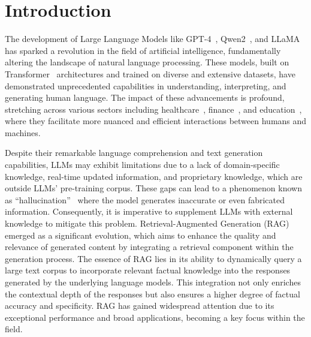 \documentclass[acmsmall]{acmart}
\begin{document}

\maketitle

\section{Introduction}\label{sec:intro}
The development of Large Language Models like GPT-4~\cite{ref:gpt4}, Qwen2~\cite{ref:qwen2}, and LLaMA~\cite{ref:llama3} has sparked a revolution in the field of artificial intelligence, fundamentally altering the landscape of natural language processing. These models, built on Transformer~\cite{ref:transformer} architectures and trained on diverse and extensive datasets, have demonstrated unprecedented capabilities in understanding, interpreting, and generating human language. The impact of these advancements is profound, stretching across various sectors including healthcare~\cite{ref:med1,ref:med2,ref:med3}, finance~\cite{ref:financialgpt,ref:finalcialgpt2}, and education~\cite{ref:edu1,ref:edu2}, where they facilitate more nuanced and efficient interactions between humans and machines.

Despite their remarkable language comprehension and text generation capabilities, LLMs may exhibit limitations due to a lack of domain-specific knowledge, real-time updated information, and proprietary knowledge, which are outside LLMs' pre-training corpus. These gaps can lead to a phenomenon known as ``hallucination''~\cite{ref:hallucination} where the model generates inaccurate or even fabricated information. Consequently, it is imperative to supplement LLMs with external knowledge to mitigate this problem. Retrieval-Augmented Generation (RAG)~\cite{ref:ragsurvey1,ref:ragsurvey2,ref:ragsurvey3,ref:ragsurvey4,ref:ragsurvey5,ref:ragsurvey6,ref:ragsurvey7} emerged as a significant evolution, which aims to enhance the quality and relevance of generated content by integrating a retrieval component within the generation process. The essence of RAG lies in its ability to dynamically query a large text corpus to incorporate relevant factual knowledge into the responses generated by the underlying language models. This integration not only enriches the contextual depth of the responses but also ensures a higher degree of factual accuracy and specificity. RAG has gained widespread attention due to its exceptional performance and broad applications, becoming a key focus within the field.
\end{document}
